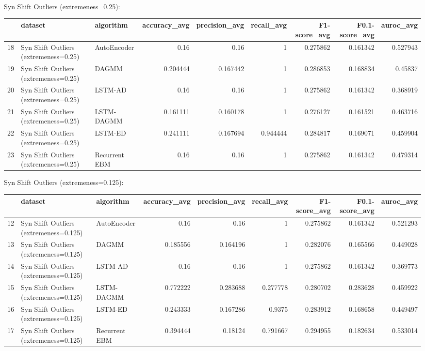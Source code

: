 Syn Shift Outliers (extremeness=0.25):

\begin{tabular}{rllrrrrrr}
\hline
    & dataset                               & algorithm     &   accuracy\_avg &   precision\_avg &   recall\_avg &   F1-score\_avg &   F0.1-score\_avg &   auroc\_avg \\
\hline
 18 & Syn Shift Outliers (extremeness=0.25) & AutoEncoder   &       0.16     &        0.16     &     1        &       0.275862 &         0.161342 &    0.527943 \\
 19 & Syn Shift Outliers (extremeness=0.25) & DAGMM         &       0.204444 &        0.167442 &     1        &       0.286853 &         0.168834 &    0.45837  \\
 20 & Syn Shift Outliers (extremeness=0.25) & LSTM-AD       &       0.16     &        0.16     &     1        &       0.275862 &         0.161342 &    0.368919 \\
 21 & Syn Shift Outliers (extremeness=0.25) & LSTM-DAGMM    &       0.161111 &        0.160178 &     1        &       0.276127 &         0.161521 &    0.463716 \\
 22 & Syn Shift Outliers (extremeness=0.25) & LSTM-ED       &       0.241111 &        0.167694 &     0.944444 &       0.284817 &         0.169071 &    0.459904 \\
 23 & Syn Shift Outliers (extremeness=0.25) & Recurrent EBM &       0.16     &        0.16     &     1        &       0.275862 &         0.161342 &    0.479314 \\
\hline
\end{tabular}

Syn Shift Outliers (extremeness=0.125):

\begin{tabular}{rllrrrrrr}
\hline
    & dataset                                & algorithm     &   accuracy\_avg &   precision\_avg &   recall\_avg &   F1-score\_avg &   F0.1-score\_avg &   auroc\_avg \\
\hline
 12 & Syn Shift Outliers (extremeness=0.125) & AutoEncoder   &       0.16     &        0.16     &     1        &       0.275862 &         0.161342 &    0.521293 \\
 13 & Syn Shift Outliers (extremeness=0.125) & DAGMM         &       0.185556 &        0.164196 &     1        &       0.282076 &         0.165566 &    0.449028 \\
 14 & Syn Shift Outliers (extremeness=0.125) & LSTM-AD       &       0.16     &        0.16     &     1        &       0.275862 &         0.161342 &    0.369773 \\
 15 & Syn Shift Outliers (extremeness=0.125) & LSTM-DAGMM    &       0.772222 &        0.283688 &     0.277778 &       0.280702 &         0.283628 &    0.459922 \\
 16 & Syn Shift Outliers (extremeness=0.125) & LSTM-ED       &       0.243333 &        0.167286 &     0.9375   &       0.283912 &         0.168658 &    0.449497 \\
 17 & Syn Shift Outliers (extremeness=0.125) & Recurrent EBM &       0.394444 &        0.18124  &     0.791667 &       0.294955 &         0.182634 &    0.533014 \\
\hline
\end{tabular}

